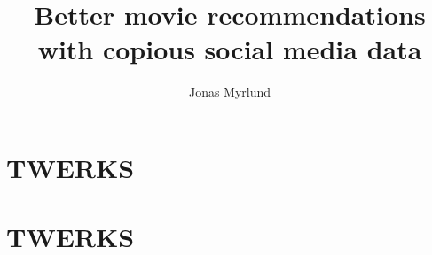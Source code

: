 \documentclass[11pt,a4paper]{article}
\begin{document}
  \title{Better movie recommendations with copious social media data}
  \author{Jonas Myrlund}

  \maketitle
  
  \section{TWERKS} %
  \label{sec1}
  
  \clearpage
  

  \section{TWERKS} %
  \label{sec2}
  
\end{document}
